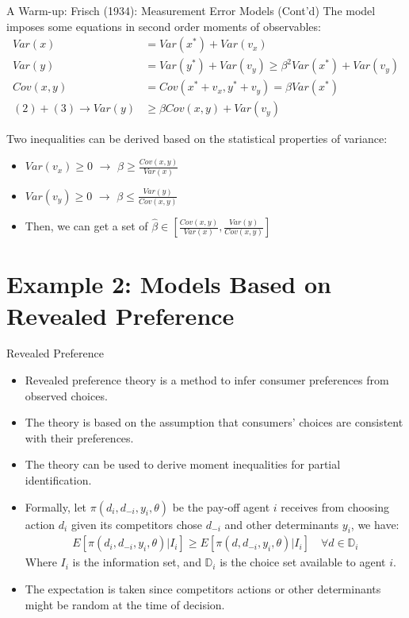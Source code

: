 \documentclass[aspectratio=169]{beamer}  %
\begin{document}
\begin{frame}{A Warm-up: Frisch (1934): Measurement Error Models (Cont'd)}
The model imposes some equations in second order moments of observables:
\begin{align}
    Var(x) &= Var(x^*) + Var(v_x) \\
    Var(y) &= Var(y^*) + Var(v_y) \geq \beta^2 Var(x^*) + Var(v_y) \\
    Cov(x, y) &= Cov(x^* + v_x, y^* + v_y)= \beta Var(x^*) \\
    (2) + (3) \rightarrow Var(y) &\geq \beta Cov(x, y) + Var(v_y)
\end{align}

Two inequalities can be derived based on the statistical properties of variance:
\begin{itemize}
    \item $Var(v_x) \geq 0$ $\rightarrow$ $\beta \geq \frac{Cov(x, y)}{Var(x)}$
    
    \item $Var(v_y) \geq 0$ $\rightarrow$ $\beta \leq \frac{Var(y)}{Cov(x, y)}$
    \item Then, we can get a set of $\hat{\beta} \in [\frac{Cov(x, y)}{Var(x)}, \frac{Var(y)}{Cov(x, y)}]$
\end{itemize}
\end{frame}


\section{Example 2: Models Based on Revealed Preference}
\begin{frame}{Revealed Preference}
    \begin{itemize}
        \item Revealed preference theory is a method to infer consumer preferences from observed choices.
        \item The theory is based on the assumption that consumers' choices are consistent with their preferences.
        \item The theory can be used to derive moment inequalities for partial identification.
        \item Formally, let $\pi(d_i, d_{-i}, y_i, \theta)$ be the pay-off agent $i$ receives from choosing action $d_i$ given its competitors chose $d_{-i}$ and other determinants $y_i$, we have:
        \begin{align*}
            E\left[\pi(d_i, d_{-i}, y_i, \theta) | I_i\right] \geq E\left[\pi(d, d_{-i}, y_i, \theta) | I_i\right] \quad \forall d \in \mathbb{D}_i
        \end{align*}
        Where $I_i$ is the information set, and $\mathbb{D}_i$ is the choice set available to agent $i$.
        \item The expectation is taken since competitors actions or other determinants might be random at the time of decision.
    \end{itemize}

\end{frame}
\end{document}
